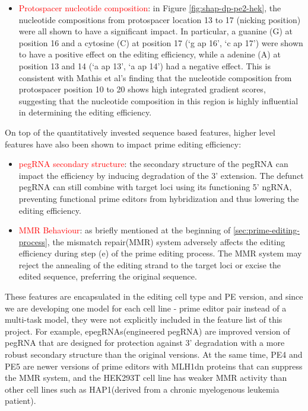 \begin{itemize}[itemsep=-0mm]
    \item \textcolor{red}{Protospacer nucleotide composition}: in Figure \ref{fig:shap-dp-pe2-hek}, the nucleotide compositions from protospacer location 13 to 17 (nicking position) were all shown to have a significant impact. In particular, a guanine (G) at position 16 and a cytosine (C) at position 17 (`g ap 16', `c ap 17')
     were shown to have a positive effect on the editing efficiency, while a adenine (A) at position 13 and 14 (`a ap 13', `a ap 14') had a negative effect.
    This is consistent with Mathis et al's finding that the nucleotide composition from protospacer position 10 to 20 shows high integrated gradient scores, suggesting that the nucleotide composition in this region is highly influential in determining the editing efficiency\cite{mathisPredictingPrimeEditing2023}.
\end{itemize}

On top of the quantitatively invested sequence based features, higher level features have also been shown to impact prime editing efficiency:
\begin{itemize}[itemsep=-0mm]
    \item \textcolor{red}{pegRNA secondary structure}: the secondary structure of the pegRNA can impact the efficiency by inducing degradation of the 3' extension. The defunct pegRNA can still combine with target loci using its functioning 5' ngRNA, preventing functional prime editors from hybridization and thus lowering the editing efficiency\cite{nelsonEngineeredPegRNAsImprove2022}.
    \item \textcolor{red}{MMR Behaviour}: as briefly mentioned at the beginning of \autoref{sec:prime-editing-process}, the mismatch repair(MMR) system adversely affects the editing efficiency during step (e) of the prime editing process. The MMR system may reject the annealing of the editing strand to the target loci or  excise the edited sequence, preferring the original sequence\cite{chenEnhancedPrimeEditing2021}. 
\end{itemize}

These features are encapsulated in the editing cell type and PE version, and since we are developing one model for each cell line - prime editor pair instead of a multi-task model, they were not explicitly included in the feature list of this project. For example, epegRNAs(engineered pegRNA) are improved version of pegRNA that are designed for protection against 3' degradation with a more robust secondary structure than the original versions\cite{nelsonEngineeredPegRNAsImprove2022}. At the same time, PE4 and PE5 are newer versions of prime editors with MLH1dn proteins that can suppress the MMR system\cite{chenEnhancedPrimeEditing2021}, and the HEK293T cell line has weaker MMR activity than other cell lines such as HAP1(derived from a chronic myelogenous leukemia patient)\cite{mathisPredictingPrimeEditing2023}. 

